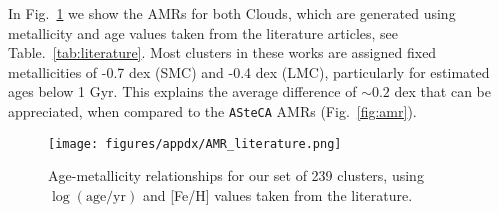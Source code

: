 \documentclass[draft]{aa}
\renewcommand{\includegraphics}[2][]{}
\begin{document}
\begin{appendix}



In Fig.~\ref{fig:amr_lit} we show the AMRs for both Clouds, which are generated using
metallicity and age values taken from the literature articles, see
Table.~\ref{tab:literature}.
Most clusters in these works are assigned fixed metallicities of -0.7 dex (SMC)
and -0.4 dex (LMC), particularly for estimated ages below 1 Gyr. This explains
the average difference of ${\sim}0.2$ dex that can be appreciated, when compared
to the \texttt{ASteCA} AMRs (Fig.~\ref{fig:amr}).

\begin{figure}
\centering
\texttt{[image: figures/appdx/AMR\_literature.png]}
\caption{Age-metallicity relationships for our set of 239 clusters, using
$\log\mathrm{(age/yr)}$ and [Fe/H] values taken from the literature.}
\label{fig:amr_lit}
\end{figure}

\end{appendix} 
\end{document}
